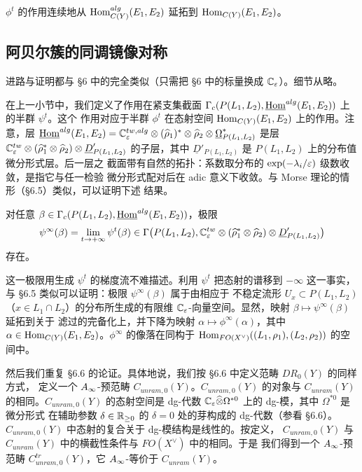 \begin{prp}
$\phi^t$ 的作用连续地从 $\operatorname{Hom}^{alg}_{C(Y)}(E_1,E_2)$ 延拓到
$\operatorname{Hom}_{C(Y)}(E_1,E_2)$。
\end{prp}

\subsection{阿贝尔簇的同调镜像对称}

进路与证明都与 §6 中的完全类似（只需把 §6 中的标量换成 $\mathbb{C}_{\varepsilon}$）。细节从略。

在上一小节中，我们定义了作用在紧支集截面
$\Gamma_c(P(L_1,L_2),\underline{\operatorname{Hom}}^{alg}(E_1,E_2))$ 上的半群 $\psi^t$。这个
作用对应于半群 $\phi^t$ 在态射空间 $\operatorname{Hom}_{C(Y)}(E_1,E_2)$ 上的作用。注意，层
$\underline{\operatorname{Hom}}^{alg}(E_1,E_2)
=\mathbb{C}^{tw,alg}_{\varepsilon}\otimes(\widehat{\rho}_1)^{*}\otimes\widehat{\rho}_2
\otimes\underline{\Omega}^{*}_{P(L_1,L_2)}$ 是层
$\mathbb{C}^{tw}_{\varepsilon}\otimes(\widehat{\rho}^{*}_1\otimes\widehat{\rho}_2)
\otimes\underline{D}'_{P(L_1,L_2)}$ 的子层，其中
$\underline{D}'_{P(L_1,L_2)}$ 是 $P(L_1,L_2)$ 上的分布值微分形式层。后一层之
截面带有自然的拓扑：系数取分布的 $\exp(-\lambda_i/\varepsilon)$ 级数收敛，是指它与任一检验
微分形式配对后在 adic 意义下收敛。与 Morse 理论的情形（§6.5）类似，可以证明下述
结果。

\begin{prp}
对任意 $\beta\in\Gamma_c(P(L_1,L_2),\underline{\operatorname{Hom}}^{alg}(E_1,E_2))$，极限
\[
  \psi^{\infty}(\beta)=\lim_{t\to+\infty}\psi^t(\beta)\in
  \Gamma\bigl(P(L_1,L_2),\mathbb{C}^{tw}_{\varepsilon}\otimes
  (\widehat{\rho}^{*}_1\otimes\widehat{\rho}_2)\otimes
  \underline{D}'_{P(L_1,L_2)}\bigr)
\]
存在。
\end{prp}

这一极限用生成 $\psi^t$ 的梯度流不难描述。利用 $\psi^t$ 把态射的谱移到
$-\infty$ 这一事实，与 §6.5 类似可以证明：极限 $\psi^{\infty}(\beta)$ 属于由相应于
不稳定流形 $U_x\subset P(L_1,L_2)$（$x\in L_1\cap L_2$）的分布所生成的有限维
$\mathbb{C}_{\varepsilon}$-向量空间。显然，映射 $\beta\mapsto\psi^{\infty}(\beta)$ 延拓到关于
滤过的完备化上，并下降为映射 $\alpha\mapsto\phi^{\infty}(\alpha)$，其中
$\alpha\in\operatorname{Hom}_{C(Y)}(E_1,E_2)$。$\phi^{\infty}$ 的像落在同构于
$\operatorname{Hom}_{FO(X^{\vee})}((L_1,\rho_1),(L_2,\rho_2))$ 的空间中。

然后我们重复 §6.6 的论证。具体地说，我们按 §6.6 中定义范畴 $DR_0(Y)$ 的同样方式，
定义一个 $A_{\infty}$-预范畴 $C_{unram,0}(Y)$。$C_{unram,0}(Y)$ 的对象与
$C_{unram}(Y)$ 的相同。$C_{unram,0}(Y)$ 的态射空间是 dg-代数
$\mathbb{C}_{\varepsilon}\widehat{\otimes}\Omega^{*0}$ 上的 dg-模，其中 $\Omega^{*0}$ 是微分形式
在辅助参数 $\delta\in\mathbb{R}_{\ge0}$ 的 $\delta=0$ 处的芽构成的 dg-代数（参看 §6.6）。
$C_{unram,0}(Y)$ 中态射的复合关于 dg-模结构是线性的。按定义，
$C_{unram,0}(Y)$ 与 $C_{unram}(Y)$ 中的横截性条件与 $FO(X^{\vee})$ 中的相同。于是
我们得到一个 $A_{\infty}$-预范畴 $C^{tr}_{unram,0}(Y)$，它 $A_{\infty}$-等价于
$C_{unram}(Y)$。

